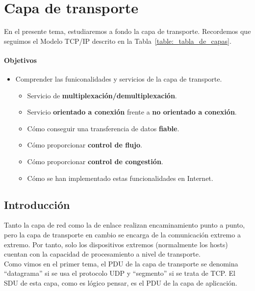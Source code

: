 \chapter{Capa de transporte}

En el presente tema, estudiaremos a fondo la capa de transporte. Recordemos que seguimos el Modelo TCP/IP descrito en la Tabla~\ref{table:_tabla_de_capas}.

\subsubsection{Objetivos}
\begin{itemize}
    \item Comprender las funiconalidades y servicios de la capa de transporte.
        \begin{itemize}
            \item Servicio de \textbf{multiplexación/demultiplexación}.
            \item Servicio \textbf{orientado a conexión} frente a \textbf{no orientado a conexión}.
            \item Cómo conseguir una transferencia de datos \textbf{fiable}.
            \item Cómo proporcionar \textbf{control de flujo}.
            \item Cómo proporcionar \textbf{control de congestión}.
            \item Cómo se han implementado estas funcionalidades en Internet.
        \end{itemize}
\end{itemize}

\section{Introducción}

Tanto la capa de red como la de enlace realizan encaminamiento punto a punto, pero la capa de transporte en cambio se encarga de la comunicación extremo a extremo. Por tanto, solo los dispositivos extremos (normalmente los hosts) cuentan con la capacidad de procesamiento a nivel de transporte. \\

Como vimos en el primer tema, el \acrshort{PDU} de la capa de transporte se denomina ``datagrama'' si se usa el protocolo \acrshort{UDP} y ``segmento'' si se trata de \acrshort{TCP}. El \acrshort{SDU} de esta capa, como es lógico pensar, es el \acrshort{PDU} de la capa de aplicación.\\

